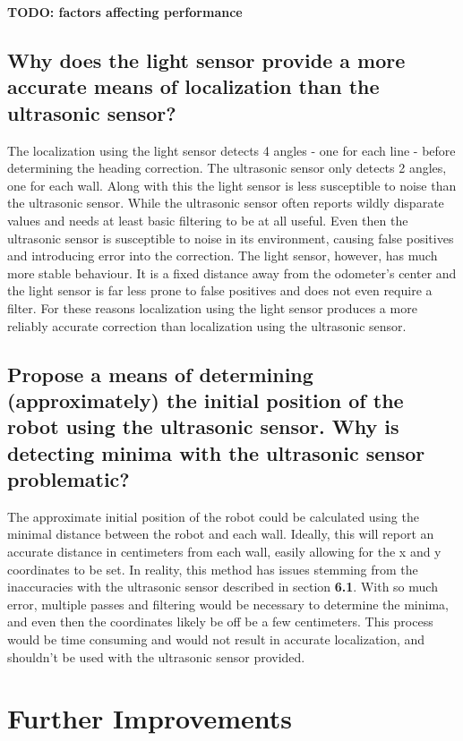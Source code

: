 \documentclass[11pt]{article}
\begin{document}
\textbf{TODO: factors affecting performance}

\subsection{Why does the light sensor provide a more accurate means of localization than the
ultrasonic sensor?}
\par The localization using the light sensor detects 4 angles - one for each line - before determining the heading correction. The ultrasonic sensor only detects 2 angles, one for each wall. Along with this the light sensor is less susceptible to noise than the ultrasonic sensor. While the ultrasonic sensor often reports wildly disparate values and needs at least basic filtering to be at all useful. Even then the ultrasonic sensor is susceptible to noise in its environment, causing false positives and introducing error into the correction. The light sensor, however, has much more stable behaviour. It is a fixed distance away from the odometer's center and the light sensor is far less prone to false positives and does not even require a filter. For these reasons localization using the light sensor produces a more reliably accurate correction than localization using the ultrasonic sensor.

\subsection{Propose a means of determining (approximately) the initial position of the robot using
the ultrasonic sensor. Why is detecting minima with the ultrasonic sensor problematic?}
\par The approximate initial position of the robot could be calculated using the minimal distance between the robot and each wall. Ideally, this will report an accurate distance in centimeters from each wall, easily allowing for the x and y coordinates to be set. In reality, this method has issues stemming from the inaccuracies with the ultrasonic sensor described in section \textbf{6.1}. With so much error, multiple passes and filtering would be necessary to determine the minima, and even then the coordinates likely be off be a few centimeters. This process would be time consuming and would not result in accurate localization, and shouldn't be used with the ultrasonic sensor provided.

\section{Further Improvements}
\end{document}
